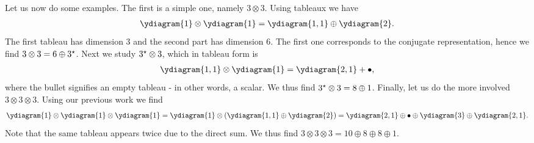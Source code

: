 Let us now do some examples. The first is a simple one, namely $3\otimes 3$. Using tableaux we have
\begin{align*}
	\ydiagram{1} \otimes \ydiagram{1} = \ydiagram{1, 1} \oplus \ydiagram{2}.
\end{align*}
The first tableau has dimension $3$ and the second part has dimension $6$. The first one corresponds to the conjugate representation, hence we find $3\otimes 3 = 6 \oplus 3^{\star}$. Next we study $3^{\star}\otimes 3$, which in tableau form is
\begin{align*}
	\ydiagram{1, 1} \otimes \ydiagram{1} = \ydiagram{2, 1} + \bullet,
\end{align*}
where the bullet signifies an empty tableau - in other words, a scalar. We thus find $3^{\star}\otimes 3 = 8\oplus 1$. Finally, let us do the more involved $3\otimes 3 \otimes 3$. Using our previous work we find
\begin{align*}
	\ydiagram{1} \otimes \ydiagram{1} \otimes \ydiagram{1} = \ydiagram{1} \otimes \left(\ydiagram{1, 1} \oplus \ydiagram{2}\right) = \ydiagram{2, 1} \oplus \bullet \oplus \ydiagram{3} \oplus \ydiagram{2, 1}.
\end{align*}
Note that the same tableau appears twice due to the direct sum. We thus find $3\otimes 3 \otimes 3 = 10 \oplus 8 \oplus 8 \oplus 1$.